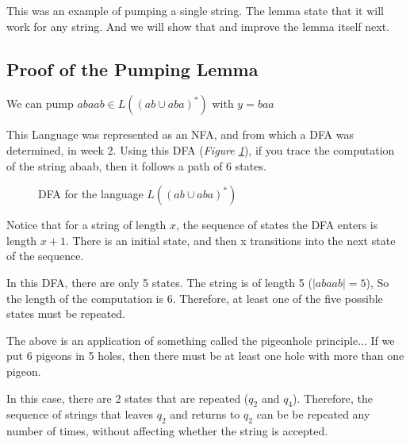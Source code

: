 \documentclass[11pt]{article}
\begin{document}
This was an example of pumping a single string. The lemma state that it will
work for any string. And we will show that and improve the lemma itself next.

\subsection{Proof of the Pumping Lemma}
We can pump $abaab \in L((ab \cup aba)^\ast)$ with $y=baa$

This Language was represented as an NFA, and from which a DFA was determined, in
week 2. Using this DFA (\emph{Figure \ref{fig:pumplemmaproof}}), if you trace the computation of the string abaab, then
it follows a path of 6 states.

\begin{figure}[H]
	\centering
	\caption{DFA for the language $L((ab \cup aba)^\ast)$}
	\label{fig:pumplemmaproof}
\end{figure}

Notice that for a string of length $x$, the sequence of states the DFA enters is
length $x+1$. There is an initial state, and then x transitions into the next
state of the sequence.

In this DFA, there are only 5 states. The string is of length 5 ($|abaab| = 5$),
So the length of the computation is 6. Therefore, at least one of the five
possible states must be repeated.

The above is an application of something called the pigeonhole principle... If
we put 6 pigeons in 5 holes, then there must be at least one hole with more than
one pigeon.

In this case, there are 2 states that are repeated ($q_2$ and $q_4$). Therefore,
the sequence of strings that leaves $q_2$ and returns to $q_2$ can be be repeated
any number of times, without affecting whether the string is accepted.
\end{document}
